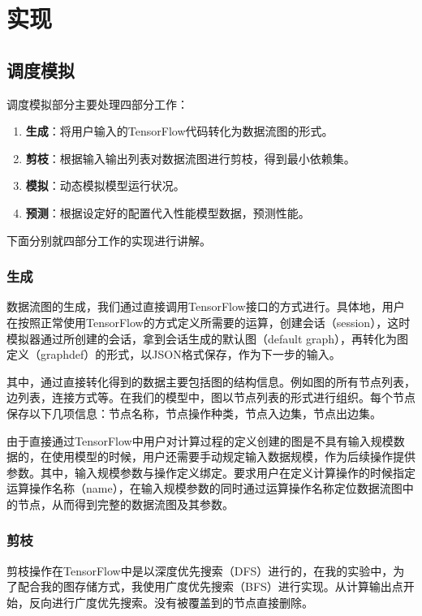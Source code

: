 \chapter{实现}
\label{cha:impl}

\section{调度模拟}
    调度模拟部分主要处理四部分工作：
    \begin{enumerate}
        \setlength{\itemindent}{1em}
        \item {\bfseries 生成}：将用户输入的TensorFlow代码转化为数据流图的形式。
        \item {\bfseries 剪枝}：根据输入输出列表对数据流图进行剪枝，得到最小依赖集。
        \item {\bfseries 模拟}：动态模拟模型运行状况。
        \item {\bfseries 预测}：根据设定好的配置代入性能模型数据，预测性能。
    \end{enumerate}
    
    下面分别就四部分工作的实现进行讲解。

\subsection{生成}
    数据流图的生成，我们通过直接调用TensorFlow接口的方式进行。具体地，用户在按照正常使用TensorFlow的方式定义所需要的运算，创建会话（session），这时模拟器通过所创建的会话，拿到会话生成的默认图（default graph），再转化为图定义（graphdef）的形式，以JSON格式保存，作为下一步的输入。
    
    其中，通过直接转化得到的数据主要包括图的结构信息。例如图的所有节点列表，边列表，连接方式等。在我们的模型中，图以节点列表的形式进行组织。每个节点保存以下几项信息：节点名称，节点操作种类，节点入边集，节点出边集。
    
    由于直接通过TensorFlow中用户对计算过程的定义创建的图是不具有输入规模数据的，在使用模型的时候，用户还需要手动规定输入数据规模，作为后续操作提供参数。其中，输入规模参数与操作定义绑定。要求用户在定义计算操作的时候指定运算操作名称（name），在输入规模参数的同时通过运算操作名称定位数据流图中的节点，从而得到完整的数据流图及其参数。
    
\subsection{剪枝}
    剪枝操作在TensorFlow中是以深度优先搜索（DFS）进行的，在我的实验中，为了配合我的图存储方式，我使用广度优先搜索（BFS）进行实现。从计算输出点开始，反向进行广度优先搜索。没有被覆盖到的节点直接删除。
    
